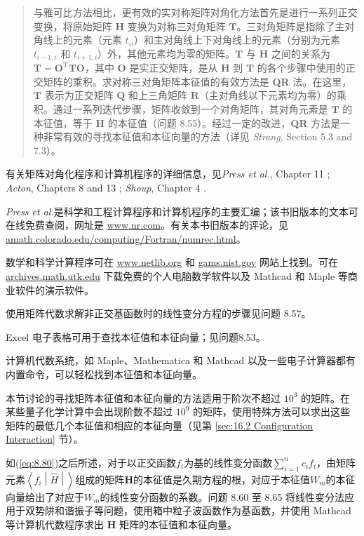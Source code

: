     \begin{quote}
        \small
        \noindent 与雅可比方法相比，更有效的实对称矩阵对角化方法首先是进行一系列正交变换，将原始矩阵 $\mathbf{H}$ 变换为对称三对角矩阵 $\mathbf{T}$。三对角矩阵是指除了主对角线上的元素（元素 $t_{ii}$）和主对角线上下对角线上的元素（分别为元素 $t_{i-1,i}$ 和 $t_{i+1,i}$）外，其他元素均为零的矩阵。$\mathbf{T}$ 与 $\mathbf{H}$ 之间的关系为 $\mathbf{T} = \mathbf{O}^{\mathrm{T}}\mathbf{TO}$，其中 $\mathbf{O}$ 是实正交矩阵，是从 $\mathbf{H}$ 到 $\mathbf{T}$ 的各个步骤中使用的正交矩阵的乘积。求对称三对角矩阵本征值的有效方法是 \textbf{QR} 法。在这里，$\mathbf{T}$ 表示为正交矩阵 $\mathbf{Q}$ 和上三角矩阵 $\mathbf{R}$（主对角线以下元素均为零）的乘积。通过一系列迭代步骤，矩阵收敛到一个对角矩阵，其对角元素是 $\mathbf{T}$ 的本征值，等于 $\mathbf{H}$ 的本征值（问题 8.55）。经过一定的改进，\textbf{QR} 方法是一种非常有效的寻找本征值和本征向量的方法（详见 \textit{Strang}, Section 5.3 and 7.3）。
    \end{quote}

    有关矩阵对角化程序和计算机程序的详细信息，见\textit{Press et al.}, Chapter 11 ; \textit{Acton}, Chapters 8 and 13 ; \textit{Shoup}, Chapter 4 .
    
    \textit{Press et al.}是科学和工程计算程序和计算机程序的主要汇编；该书旧版本的文本可在线免费查阅，网址是 \url{www.nr.com}。有关本书旧版本的评论，见 \url{amath.colorado.edu/computing/Fortran/numrec.html}。

    数学和科学计算程序可在 \url{www.netlib.org} 和 \url{gams.nist.gov} 网站上找到。可在 \url{archives.math.utk.edu} 下载免费的个人电脑数学软件以及 Mathcad 和 Maple 等商业软件的演示软件。

    使用矩阵代数求解非正交基函数时的线性变分方程的步骤见问题 8.57。

    Excel 电子表格可用于查找本征值和本征向量；见问题8.53。

    计算机代数系统，如 Maple、Mathematica 和 Mathcad 以及一些电子计算器都有内置命令，可以轻松找到本征值和本征向量。

    本节讨论的寻找矩阵本征值和本征向量的方法适用于阶次不超过 $10 ^3$ 的矩阵。在某些量子化学计算中会出现阶数不超过 $10^ 9$ 的矩阵，使用特殊方法可以求出这些矩阵的最低几个本征值和相应的本征向量（见第 \ref{sec:16.2 Configuration Interaction} 节）。

    如(\ref{eq:8.80})之后所述，对于以正交函数$f_i$为基的线性变分函数$\sum_{i=1}^{n}c_if_i$，由矩阵元素$\left\langle f_i \middle| \hat{H} \middle| \right\rangle$组成的矩阵$\mathbf{H}$的本征值是久期方程的根，对应于本征值$W_m$的本征向量给出了对应于$W_m$的线性变分函数的系数。问题 8.60 至 8.65 将线性变分法应用于双势阱和谐振子等问题，使用箱中粒子波函数作为基函数，并使用 Mathcad 等计算机代数程序求出 $\mathbf{H}$ 矩阵的本征值和本征向量。

